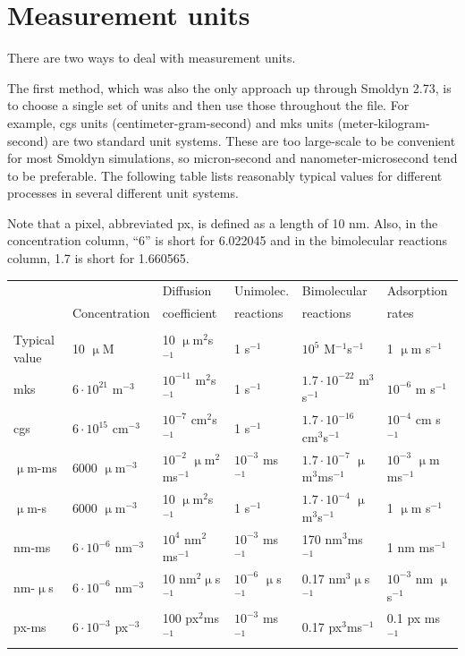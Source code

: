 \documentclass {scrbook}
\begin{document}
\section{Measurement units}
\label{sect:ConfigUnits}

There are two ways to deal with measurement units.

The first method, which was also the only approach up through Smoldyn 2.73, is to choose a single set of units and then use those throughout the file. For example, cgs units (centimeter-gram-second) and mks units (meter-kilogram-second) are two standard unit systems. These are too large-scale to be convenient for most Smoldyn simulations, so micron-second and nanometer-microsecond tend to be preferable. The following table lists reasonably typical values for different processes in several different unit systems.

Note that a pixel, abbreviated px, is defined as a length of 10 nm. Also, in the concentration column, ``6'' is short for 6.022045 and in the bimolecular reactions column, 1.7 is short for 1.660565.

{\small
\begin{longtable}[c]{llllll}
&& Diffusion & Unimolec. & Bimolecular & Adsorption\\
& Concentration & coefficient & reactions & reactions & rates\\
\hline \\
Typical value & 10 $\upmu$M & 10 $\upmu$m$^2$s$^{-1}$ & 1 s$^{-1}$ & $10^5$ M$^{-1}$s$^{-1}$ & 1 $\upmu$m s$^{-1}$\\
mks & $6\cdot10^{21}$ m$^{-3}$ & $10^{-11}$ m$^2$s$^{-1}$ & 1 s$^{-1}$ & $1.7\cdot10^{-22}$ m$^3$s$^{-1}$ & $10^{-6}$ m s$^{-1}$\\
cgs & $6\cdot10^{15}$ cm$^{-3}$ & $10^{-7}$ cm$^2$s$^{-1}$ & 1 s$^{-1}$ & $1.7\cdot10^{-16}$ cm$^3$s$^{-1}$ & $10^{-4}$ cm s$^{-1}$\\
$\upmu$m-ms & 6000 $\upmu$m$^{-3}$ & $10^{-2}$ $\upmu$m$^2$ms$^{-1}$ & $10^{-3}$ ms$^{-1}$ & $1.7\cdot10^{-7}$ $\upmu$m$^3$ms$^{-1}$ & $10^{-3}$ $\upmu$m ms$^{-1}$\\
$\upmu$m-s & 6000 $\upmu$m$^{-3}$ & 10 $\upmu$m$^2$s$^{-1}$ & 1 s$^{-1}$ & $1.7\cdot10^{-4}$ $\upmu$m$^3$s$^{-1}$ & 1 $\upmu$m s$^{-1}$\\
nm-ms & $6\cdot10^{-6}$ nm$^{-3}$ & $10^4$ nm$^2$ms$^{-1}$ & $10^{-3}$ ms$^{-1}$ & 170 nm$^3$ms$^{-1}$ & 1 nm ms$^{-1}$\\
nm-$\upmu$s & $6\cdot10^{-6}$ nm$^{-3}$ & 10 nm$^2$$\upmu$s$^{-1}$ & $10^{-6}$ $\upmu$s$^{-1}$ & 0.17 nm$^3$$\upmu$s$^{-1}$ & $10^{-3}$ nm $\upmu$s$^{-1}$\\
px-ms & $6\cdot10^{-3}$ px$^{-3}$ & 100 px$^2$ms$^{-1}$ & $10^{-3}$ ms$^{-1}$ & 0.17 px$^3$ms$^{-1}$ & 0.1 px ms$^{-1}$\\
\end{longtable}}
\end{document}
